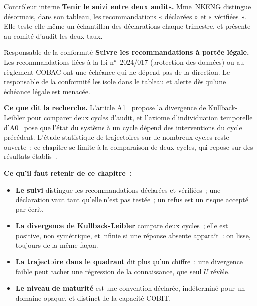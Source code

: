 \begin{boxmetier}{Contrôleur interne}
\textbf{Tenir le suivi entre deux audits.} Mme~NKENG distingue désormais,
dans son tableau, les recommandations « déclarées » et « vérifiées ». Elle
teste elle-même un échantillon des déclarations chaque trimestre, et
présente au comité d'audit les deux taux.
\end{boxmetier}

\begin{boxmetier}{Responsable de la conformité}
\textbf{Suivre les recommandations à portée légale.} Les recommandations
liées à la loi n°~2024/017 (protection des données) ou au règlement COBAC
ont une échéance qui ne dépend pas de la direction. Le responsable de la
conformité les isole dans le tableau et alerte dès qu'une échéance légale
est menacée.
\end{boxmetier}

\begin{boxinfo}
\textbf{Ce que dit la recherche.} L'article A1~\cite{minka2026nek} propose la
divergence de Kullback-Leibler pour comparer deux cycles d'audit, et l'axiome
d'individuation temporelle d'A0~\cite{minka2026auditologie} pose que l'état
du système à un cycle dépend des interventions du cycle précédent. L'étude
statistique de trajectoires sur de nombreux cycles reste ouverte~; ce
chapitre se limite à la comparaison de deux cycles, qui repose sur des
résultats établis~\cite{kullback1951,cover2006elements}.
\end{boxinfo}

\separateur

\begin{boxresume}
\textbf{Ce qu'il faut retenir de ce chapitre~:}
\begin{itemize}
    \item \textbf{Le suivi} distingue les recommandations déclarées et
          vérifiées~; une déclaration vaut \NEK{} tant qu'elle n'est pas
          testée~; un refus est un risque accepté par écrit.
    \item \textbf{La divergence de Kullback-Leibler} compare deux cycles~;
          elle est positive, non symétrique, et infinie si une réponse
          absente apparaît~: on lisse, toujours de la même façon.
    \item \textbf{La trajectoire dans le quadrant} dit plus qu'un chiffre~:
          une divergence faible peut cacher une régression de la
          connaissance, que seul $U$ révèle.
    \item \textbf{Le niveau de maturité} est une convention déclarée,
          indéterminé pour un domaine opaque, et distinct de la capacité
          COBIT.
\end{itemize}
\end{boxresume}

